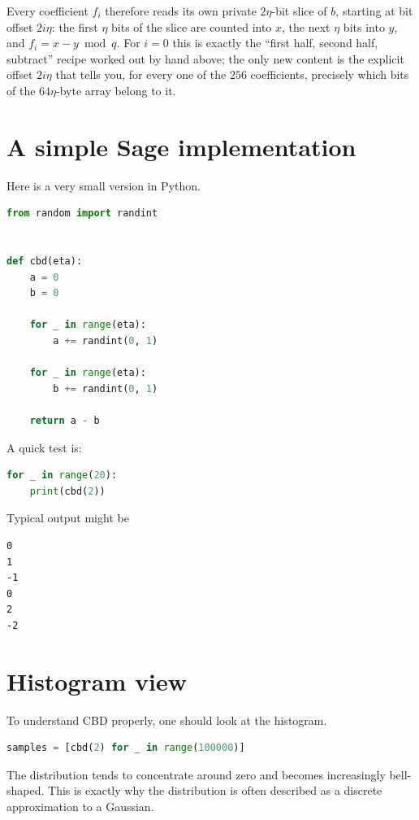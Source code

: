 Every coefficient $f_i$ therefore reads its own private $2\eta$-bit slice of $b$, starting at bit offset $2i\eta$: the first $\eta$ bits of the slice are counted into $x$, the next $\eta$ bits into $y$, and $f_i=x-y \bmod q$. For $i=0$ this is exactly the ``first half, second half, subtract'' recipe worked out by hand above; the only new content is the explicit offset $2i\eta$ that tells you, for every one of the $256$ coefficients, precisely which bits of the $64\eta$-byte array belong to it.

\section{A simple Sage implementation}

Here is a very small version in Python.

\begin{lstlisting}[language=Python]
from random import randint


def cbd(eta):
    a = 0
    b = 0

    for _ in range(eta):
        a += randint(0, 1)

    for _ in range(eta):
        b += randint(0, 1)

    return a - b
\end{lstlisting}

A quick test is:

\begin{lstlisting}[language=Python]
for _ in range(20):
    print(cbd(2))
\end{lstlisting}

Typical output might be

\begin{verbatim}
0
1
-1
0
2
-2
\end{verbatim}

\section{Histogram view}

To understand CBD properly, one should look at the histogram.

\begin{lstlisting}[language=Python]
samples = [cbd(2) for _ in range(100000)]
\end{lstlisting}

The distribution tends to concentrate around zero and becomes increasingly bell-shaped. This is exactly why the distribution is often described as a discrete approximation to a Gaussian.

